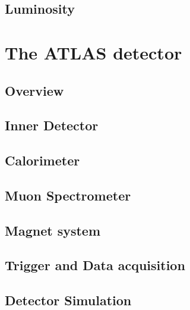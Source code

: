 \subsection{Luminosity}

\section{The ATLAS detector}
\subsection{Overview}
\subsection{Inner Detector}
\subsection{Calorimeter}
\subsection{Muon Spectrometer}
\subsection{Magnet system}
\subsection{Trigger and Data acquisition}
\subsection{Detector Simulation}


